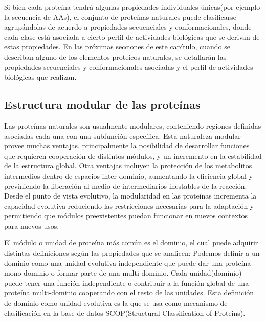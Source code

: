 Si bien cada proteína tendrá algunas propiedades individuales únicas(por ejemplo la secuencia de AAs), 
el conjunto de proteínas naturales puede clasificarse 
agrupándolas de acuerdo a propiedades secuenciales y conformacionales, donde cada clase está asociada a cierto perfil de actividades biológicas que se derivan de estas propiedades.
En las próximas secciones de este capítulo, cuando se describan alguno de los elementos proteícos naturales, 
se detallarán las propiedades secuenciales y conformacionales asociadas y el perfil de actividades biológicas que realizan.









\subsection{Estructura modular de las proteínas}

Las proteínas naturales son usualmente modulares, conteniendo regiones definidas asociadas cada una con una subfunción específica.
Esta naturaleza modular provee muchas ventajas, principalmente la posibilidad de desarrollar funciones que requieren cooperación de distintos módulos, y un incremento en la estabilidad de la estructura global.
Otra ventajas incluyen la protección de los metabolitos intermedios dentro de espacios inter-dominio, aumentando la eficiencia global y previniendo la liberación al medio de intermediarios inestables de la reacción.  
Desde el punto de vista evolutivo, la modularidad en las proteínas incrementa la capacidad evolutiva reduciendo las restricciones necesarias 
para la adaptación y permitiendo que módulos preexistentes puedan funcionar en nuevos contextos para nuevos usos.

El módulo o unidad de proteína más común es el dominio, el cual puede adquirir distintas definiciones según las propiedades que se analicen:
Podemos definir a un dominio como una unidad evolutiva independiente que puede dar una proteína mono-dominio o formar parte de una multi-dominio. 
Cada unidad(dominio) puede tener una función independiente o contribuir a la función global de una proteína multi-dominio cooperando con el resto de las unidades.
Esta definición de dominio como unidad evolutiva es la que se usa como mecanismo de clasificación en la base de datos SCOP(Structural Classification of Proteins)\cite{murzin1995scop}. 

